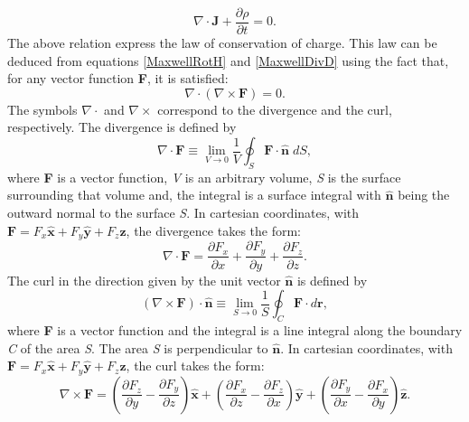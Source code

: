 \begin{equation}\label{ContinuityEquation}
	\nabla\cdot\mathbf{J} + \frac{\partial\rho}{\partial{t}} = 0.
\end{equation}
The above relation express the law of conservation of charge. This law can be deduced from equations \eqref{MaxwellRotH} and \eqref{MaxwellDivD} using the fact that, for any vector function \textbf{F}, it is satisfied:
\begin{equation}\label{DivCurleq0}
	\nabla\cdot(\nabla\times\textbf{F}) = 0.
\end{equation}
The symbols $\nabla\cdot$ and $\nabla\times$ correspond to the divergence and the curl, respectively. The divergence is defined by
\begin{equation}\label{DefDiv}
	\nabla\cdot\mathbf{F} \equiv \lim_{V \rightarrow 0} \frac{1}{V}
	\oint_{S} \mathbf{F}\cdot\mathbf{\hat{n}} \; dS,
\end{equation}
where \textbf{F} is a vector function, \textit{V} is an arbitrary volume, \textit{S} is the surface surrounding that volume and, the integral is a surface integral with $\mathbf{\hat{n}}$ being the outward normal to the
surface \textit{S}. In cartesian coordinates, with $\mathbf{F} = F_{x}\mathbf{\hat{x}} + F_{y}\mathbf{\hat{y}} + F_{z}\mathbf{\hat{z}}$, the divergence takes the form:
\begin{equation}\label{CartesianDiv}
	\nabla\cdot\mathbf{F} = \frac{\partial F_{x}}{\partial x} + \frac{\partial F_{y}}{\partial y} + \frac{\partial F_{z}}{\partial z}.
\end{equation}
The curl in the direction given by the unit vector $\mathbf{\hat{n}}$ is defined by
\begin{equation}\label{DefRot}
	(\nabla\times\mathbf{F})\cdot\mathbf{\hat{n}}  \equiv \lim_{S \rightarrow 0} \frac{1}{S} \oint_{C} \mathbf{F}\cdot d\mathbf{r},
\end{equation}
where \textbf{F} is a vector function and the integral is a line integral along the boundary \textit{C} of the area \textit{S}. The area \textit{S} is perpendicular to $\mathbf{\hat{n}}$. In cartesian coordinates, with $\mathbf{F} = F_{x}\mathbf{\hat{x}} + F_{y}\mathbf{\hat{y}} + F_{z}\mathbf{\hat{z}}$, the curl takes the form:
\begin{equation}\label{CartesianRot}
	\nabla\times\mathbf{F} =    \left(\frac{\partial F_z}{\partial y} - \frac{\partial F_y}{\partial z}\right)\mathbf{\hat{x}} + \left(\frac{\partial F_x}{\partial z} - \frac{\partial F_z}{\partial x}\right)\mathbf{\hat{y}} + \left(\frac{\partial F_y}{\partial x} - \frac{\partial F_x}{\partial y}\right)\mathbf{\hat{z}}.
\end{equation}

